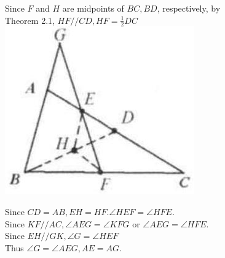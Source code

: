 \documentclass{article}
\begin{document}
Since \(F\) and \(H\) are midpoints of \(B C, B D\), respectively, by\\
Theorem 2.1, \(H F / / C D, H F=\frac{1}{2} D C\)\\
\centering
\includegraphics[width=\textwidth]{images/reasoning_image_1.jpg}

Since \(C D=A B, E H=H F . \angle H E F=\angle H F E\).\\
Since \(K F / / A C, \angle A E G=\angle K F G\) or \(\angle A E G=\angle H F E\).\\
Since \(E H / / G K, \angle G=\angle H E F\)\\
Thus \(\angle G=\angle A E G, A E=A G\).
\end{document}
